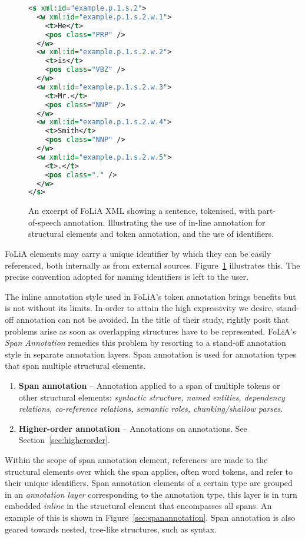 \documentclass[a4paper,10pt,twoside]{article}
\begin{document}
\begin{figure}[tbh]
\label{fig:tokenannotation}
\begin{lstlisting}[language=xml]
<s xml:id="example.p.1.s.2">
  <w xml:id="example.p.1.s.2.w.1">
    <t>He</t>
    <pos class="PRP" />
  </w>
  <w xml:id="example.p.1.s.2.w.2">
    <t>is</t>
    <pos class="VBZ" />
  </w>
  <w xml:id="example.p.1.s.2.w.3">
    <t>Mr.</t>
    <pos class="NNP" />
  </w>
  <w xml:id="example.p.1.s.2.w.4">
    <t>Smith</t>
    <pos class="NNP" />
  </w>
  <w xml:id="example.p.1.s.2.w.5">
    <t>.</t>
    <pos class="." />
  </w>
</s>
\end{lstlisting}
\caption{An excerpt of FoLiA XML showing a sentence, tokenised, with
part-of-speech annotation. Illustrating the use of in-line annotation for
structural elements and token annotation, and the use of identifiers.}
\end{figure}

FoLiA elements may carry a unique identifier by which they can be easily
referenced, both internally as from external sources. Figure~\ref{fig:tokenannotation} illustrates this. The precise convention adopted for naming identifiers is left to the user.

The inline annotation style used in FoLiA's token annotation brings benefits
but is not without its limits. In order to attain the high expressivity we
desire, stand-off annotation can not be avoided. In the title of their study,
\cite{OHCO2} rightly posit that problems arise as soon as overlapping
structures have to be represented. FoLiA's \emph{Span Annotation} remedies
this problem by resorting to a stand-off annotation style in separate
annotation layers. Span annotation is used for annotation types that span
multiple structural elements.

\begin{enumerate}
\setcounter{enumi}{\theenumTemptwo}
\item \textbf{Span annotation} -- 
Annotation applied to a span of multiple tokens or other structural elements:
\emph{syntactic structure, named entities, dependency relations, co-reference
relations, semantic roles, chunking/shallow parses}.
\item \textbf{Higher-order annotation} -- Annotations on annotations. See Section~\ref{sec:higherorder}.
\end{enumerate}


Within the scope of span annotation element, references are made to the
structural elements over which the span applies, often word tokens,
and refer to their unique identifiers. Span annotation elements of a certain
type are grouped in an \emph{annotation layer} corresponding to the annotation
type, this layer is in turn embedded \emph{inline} in the structural element
that encompasses all spans. An example of this is shown in
Figure~\ref{sec:spanannotation}. Span annotation is also geared towards nested,
tree-like structures, such as syntax.
\end{document}
